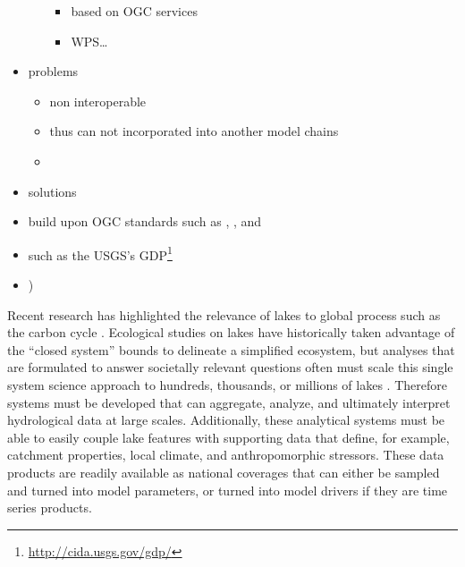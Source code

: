 \begin{itemize}
\begin{itemize}
\begin{itemize}
      \item based on OGC services
      \item WPS\dots
    \end{itemize}
  \end{itemize}
  \item problems
  \begin{itemize}
    \item non interoperable
    \item thus can not incorporated into another model chains
    \item \citep{downing2006global}
  \end{itemize}
  \item solutions

  \item build upon \ac{OGC} standards such as , ,  and 
  \item such as the USGS’s \ac{GDP}\footnote{\url{http://cida.usgs.gov/gdp/}}
  \item \citep[e.g. \la\footnote{\url{https://github.com/GLEON/Lake-Analyzer}}, see][]{read2011derivation})
\end{itemize}

Recent research has highlighted the relevance of lakes to global process such as the carbon cycle \citep{cole2007plumbing}.
Ecological studies on lakes have historically taken advantage of the ``closed system'' bounds to delineate a simplified ecosystem, but analyses that are formulated to answer societally relevant questions often must scale this single system science approach to hundreds, thousands, or millions of lakes \citep{downing2006global}.
Therefore systems must be developed that can aggregate, analyze, and ultimately interpret hydrological data at large scales. Additionally, these analytical systems must be able to easily couple lake features with supporting data that define, for example, catchment properties, local climate, and anthropomorphic stressors.
These data products are readily available as national coverages that can either be sampled and turned into model parameters, or turned into model drivers if they are time series products.

